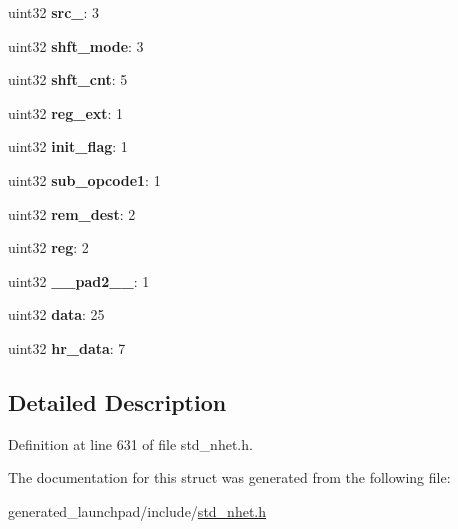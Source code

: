 \begin{DoxyCompactItemize}
\mbox{\label{structAND__format_a89651de1d3200051d36f69f695fc6cf4}} 
uint32 {\bfseries src\+\_}\+: 3
\item 
\mbox{\label{structAND__format_ad34850e613b808d9dbff354b6004829e}} 
uint32 {\bfseries shft\+\_\+mode}\+: 3
\item 
\mbox{\label{structAND__format_a766433caf02301c12a92a770f8125c6d}} 
uint32 {\bfseries shft\+\_\+cnt}\+: 5
\item 
\mbox{\label{structAND__format_aa4988c0ec462362c70b6e22bac26b178}} 
uint32 {\bfseries reg\+\_\+ext}\+: 1
\item 
\mbox{\label{structAND__format_ae6cd0a9d4fa8c70378dfeb5c441b7dd3}} 
uint32 {\bfseries init\+\_\+flag}\+: 1
\item 
\mbox{\label{structAND__format_aca7993d193cfd0f6a9a110a139de6d6e}} 
uint32 {\bfseries sub\+\_\+opcode1}\+: 1
\item 
\mbox{\label{structAND__format_aed8653b8af00fa4f72219849366f63c2}} 
uint32 {\bfseries rem\+\_\+dest}\+: 2
\item 
\mbox{\label{structAND__format_ace437bfc281f9fa4bab2fe8f5a3145a9}} 
uint32 {\bfseries reg}\+: 2
\item 
\mbox{\label{structAND__format_ae87fc6b3779d97c3b38604ce22935502}} 
uint32 {\bfseries \+\_\+\+\_\+pad2\+\_\+\+\_\+}\+: 1
\item 
\mbox{\label{structAND__format_a1ae8022ce2c9b7bb705ab21af3959ae9}} 
uint32 {\bfseries data}\+: 25
\item 
\mbox{\label{structAND__format_a668d63b64a196ff292a01c020947cc23}} 
uint32 {\bfseries hr\+\_\+data}\+: 7
\end{DoxyCompactItemize}


\subsection{Detailed Description}


Definition at line 631 of file std\+\_\+nhet.\+h.



The documentation for this struct was generated from the following file\+:\begin{DoxyCompactItemize}
\item 
generated\+\_\+launchpad/include/\mbox{\hyperlink{std__nhet_8h}{std\+\_\+nhet.\+h}}\end{DoxyCompactItemize}
